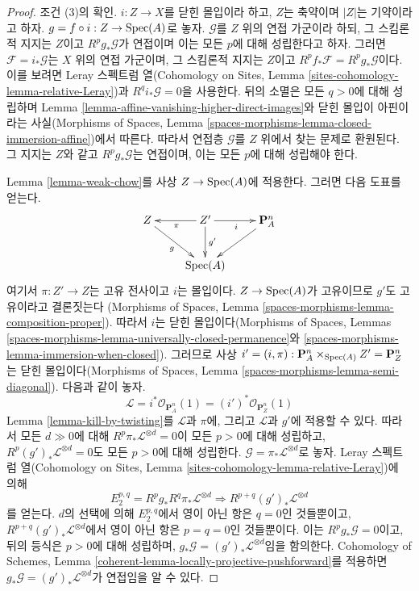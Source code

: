 \begin{proof}
\medskip\noindent
조건 (3)의 확인. $i : Z \to X$를 닫힌 몰입이라 하고, $Z$는
축약이며 $|Z|$는 기약이라고 하자.
$g = f \circ i : Z \to \mathop{\mathrm{Spec}}(A)$로 놓자. $\mathcal{G}$를 $Z$ 위의
연접 가군이라 하되, 그 스킴론적 지지는 $Z$이고
$R^pg_*\mathcal{G}$가 연접이며 이는 모든 $p$에 대해 성립한다고 하자.
그러면
$\mathcal{F} = i_*\mathcal{G}$는 $X$ 위의 연접 가군이며, 그 스킴론적
지지는 $Z$이고
$R^pf_*\mathcal{F} = R^pg_*\mathcal{G}$이다. 이를 보려면 Leray
스펙트럼 열(Cohomology on Sites, Lemma
\ref{sites-cohomology-lemma-relative-Leray})과
$R^qi_*\mathcal{G} = 0$을 사용한다. 뒤의 소멸은 모든 $q > 0$에 대해
성립하며 Lemma
\ref{lemma-affine-vanishing-higher-direct-images}와 닫힌 몰입이
아핀이라는 사실(Morphisms of Spaces, Lemma
\ref{spaces-morphisms-lemma-closed-immersion-affine})에서 따른다.
따라서 연접층 $\mathcal{G}$를 $Z$ 위에서 찾는 문제로 환원된다. 그
지지는 $Z$와 같고 $R^pg_*\mathcal{G}$는 연접이며, 이는 모든 $p$에
대해 성립해야 한다.

\medskip\noindent
Lemma \ref{lemma-weak-chow}를 사상 $Z \to \mathop{\mathrm{Spec}}(A)$에 적용한다. 그러면
다음 도표를 얻는다.
$$
\xymatrix{
Z \ar[rd]_g & Z' \ar[d]^-{g'} \ar[l]^\pi \ar[r]_i & \mathbf{P}^n_A \ar[dl] \\
& \Spec(A) &
}
$$
여기서 $\pi : Z' \to Z$는 고유 전사이고 $i$는 몰입이다.
$Z \to \mathop{\mathrm{Spec}}(A)$가 고유이므로 $g'$도 고유이라고 결론짓는다
(Morphisms of Spaces, Lemma
\ref{spaces-morphisms-lemma-composition-proper}). 따라서 $i$는 닫힌
몰입이다(Morphisms of Spaces, Lemmas
\ref{spaces-morphisms-lemma-universally-closed-permanence}와
\ref{spaces-morphisms-lemma-immersion-when-closed}). 그러므로 사상
$i' = (i, \pi) : \mathbf{P}^n_A \times_{\mathop{\mathrm{Spec}}(A)} Z' = \mathbf{P}^n_Z$는
닫힌 몰입이다(Morphisms of Spaces, Lemma
\ref{spaces-morphisms-lemma-semi-diagonal}). 다음과 같이 놓자.
$$
\mathcal{L} =
i^*\mathcal{O}_{\mathbf{P}^n_A}(1) =
(i')^*\mathcal{O}_{\mathbf{P}^n_Z}(1)
$$
Lemma \ref{lemma-kill-by-twisting}를 $\mathcal{L}$과 $\pi$에, 그리고
$\mathcal{L}$과 $g'$에 적용할 수 있다. 따라서 모든 $d \gg 0$에 대해
$R^p\pi_*\mathcal{L}^{\otimes d} = 0$이 모든 $p > 0$에 대해 성립하고,
$R^p(g')_*\mathcal{L}^{\otimes d} = 0$도 모든 $p > 0$에 대해
성립한다. $\mathcal{G} = \pi_*\mathcal{L}^{\otimes d}$로 놓자.
Leray 스펙트럼 열(Cohomology on Sites, Lemma
\ref{sites-cohomology-lemma-relative-Leray})에 의해
$$
E_2^{p, q} = R^pg_* R^q\pi_*\mathcal{L}^{\otimes d}
\Rightarrow
R^{p + q}(g')_*\mathcal{L}^{\otimes d}
$$
를 얻는다. $d$의 선택에 의해 $E_2^{p, q}$에서 영이 아닌 항은
$q = 0$인 것들뿐이고,
$R^{p + q}(g')_*\mathcal{L}^{\otimes d}$에서 영이 아닌 항은
$p = q = 0$인 것들뿐이다. 이는 $R^pg_*\mathcal{G} = 0$이고, 뒤의
등식은 $p > 0$에 대해 성립하며,
$g_*\mathcal{G} = (g')_*\mathcal{L}^{\otimes d}$임을 함의한다.
Cohomology of Schemes, Lemma
\ref{coherent-lemma-locally-projective-pushforward}를 적용하면
$g_*\mathcal{G} = (g')_*\mathcal{L}^{\otimes d}$가 연접임을 알 수 있다.


\end{proof}
